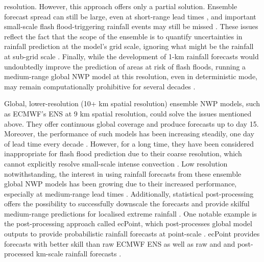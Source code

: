 resolution. However, this approach offers only a partial solution. Ensemble forecast spread can still be large, even at short-range lead times \citep{Done_2012}, and important small-scale flash flood-triggering rainfall events may still be missed \citep{Gober_2008}. These issues reflect the fact that the scope of the ensemble is to quantify uncertainties in rainfall prediction at the model's grid scale, ignoring what might be the rainfall at sub-grid scale \citep{Bouallegue_2020}. Finally, while the development of 1-km rainfall forecasts would undoubtedly improve the prediction of areas at risk of flash floods, running a medium-range global NWP model at this resolution, even in deterministic mode, may remain computationally prohibitive for several decades \citep{Zeman_2021}.

Global,  lower-resolution (10+ km spatial resolution) ensemble NWP models, such as ECMWF's ENS at 9 km spatial resolution, could solve the issues mentioned above. They offer continuous global coverage and produce forecasts up to day 15. Moreover, the performance of such models has been increasing steadily, one day of lead time every decade \citep{Bauer_2015}. However, for a long time, they have been considered inappropriate for flash flood prediction due to their coarse resolution, which cannot explicitly resolve small-scale intense convection \citep{Schumacher_2017}. Low resolution notwithstanding, the interest in using rainfall forecasts from these ensemble global NWP models has been growing due to their increased performance, especially at medium-range lead times \citep{Tripathy_2020, Bucherie_2022b}. Additionally, statistical post-processing offers the possibility to successfully downscale the forecasts and provide skilful medium-range predictions for localised extreme rainfall \citep{Vannitsem_2021}. One notable example is the post-processing approach called ecPoint, which post-processes global model outputs to provide probabilistic rainfall forecasts at point-scale \citep{Hewson_2021}. ecPoint provides forecasts with better skill than raw ECMWF ENS \citep{Hewson_2021, Pillosu_2025} as well as raw and and post-processed km-scale rainfall forecasts \citep{Gascón_2024}. 

